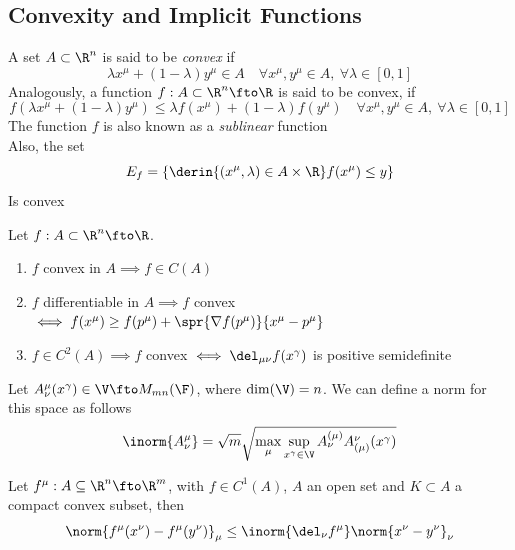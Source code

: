 \documentclass[../mmf.tex]{subfiles}
\begin{document}
\subsection{Convexity and Implicit Functions}
\begin{dfn}
	A set $A\subset\R^n$ is said to be \textit{convex} if
	\begin{equation}
		\lambda x^\mu+(1-\lambda)y^\mu\in A\quad\forall x^\mu,y^\mu\in A,\ \forall\lambda\in[0,1]
		\label{eq:convexityset}
	\end{equation}
	Analogously, a function $f:A\subset\R^n\fto\R$ is said to be convex, if
	\begin{equation}
		f\left( \lambda x^\mu+(1-\lambda)y^\mu \right)\le\lambda f(x^\mu)+(1-\lambda)f(y^\mu)\quad\forall x^\mu,y^\mu\in A,\ \forall\lambda\in[0,1]
		\label{eq:convexfx}
	\end{equation}
	The function $f$ is also known as a \textit{sublinear} function\\
	Also, the set
	\begin{equation}
		E_f=\{\derin{(x^\mu,\lambda)\in A\times\R}f(x^\mu)\le y\}
		\label{eq:convexset}
	\end{equation}
	Is convex
\end{dfn}
\begin{thm}[Convexity]
	Let $f:A\subset\R^n\fto\R$.
	\begin{enumerate}
	\item $f$ convex in $A\implies{} f\in C(A)$
	\item $f$ differentiable in $A\implies{} f$ convex $\iff f(x^\mu)\ge f(p^\mu)+\spr{\nabla f(p^\mu)}{x^\mu-p^\mu}$
	\item $f\in C^2(A)\implies{} f$ convex $\iff \del_{\mu\nu}f(x^\gamma)$ is positive semidefinite
	\end{enumerate}
\end{thm}
\begin{dfn}
	Let $A^\mu_\nu(x^\gamma)\in\V\fto M_{mn}(\F)$, where $\dim(\V)=n$. We can define a norm for this space as follows
	\begin{equation}
		\inorm{A^\mu_\nu}=\sqrt{m}\sqrt{\max_{\mu}\sup_{x^\gamma\in\V}A^{(\mu)}_\nu A^\nu_{(\mu)}(x^\gamma)}
		\label{eq:matrixinorm}
	\end{equation}
\end{dfn}
\begin{thm}
	Let $f^\mu:A\subseteq\R^n\fto\R^m$, with $f\in C^1(A)$, $A$ an open set and $K\subset A$ a compact convex subset, then
	\begin{equation}
		\norm{f^\mu(x^\nu)-f^\mu(y^\nu)}_\mu\le\inorm{\del_\nu f^\mu}\norm{x^\nu-y^\nu}_\nu
		\label{eq:averageval}
	\end{equation}
\end{thm}
\end{document}
